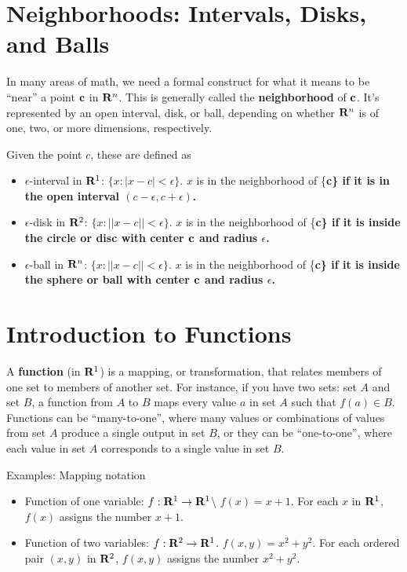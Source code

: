 \documentclass[]{book}
\providecommand{\tightlist}{%
  \setlength{\itemsep}{0pt}\setlength{\parskip}{0pt}}
\theoremstyle{definition}
\theoremstyle{definition}
\theoremstyle{definition}
\theoremstyle{remark}
\begin{document}
\section{Neighborhoods: Intervals, Disks, and
Balls}\label{neighborhoods-intervals-disks-and-balls}

In many areas of math, we need a formal construct for what it means to
be ``near'' a point \(\bf c\) in \({\bf R}^n\). This is generally called
the \textbf{neighborhood} of \(\bf c\). It's represented by an open
interval, disk, or ball, depending on whether \({\bf R}^n\) is of one,
two, or more dimensions, respectively.

Given the point \(c\), these are defined as

\begin{itemize}
\tightlist
\item
  \(\epsilon\)-interval in \({\bf R}^1\): \(\{x : |x-c|<\epsilon \}\).
  \(x\) is in the neighborhood of \{\bf c\} if it is in the open
  interval \((c-\epsilon,c+\epsilon)\).
\item
  \(\epsilon\)-disk in \({\bf R}^2\): \(\{x : || x-c ||<\epsilon\}\).
  \(x\) is in the neighborhood of \{\bf c\} if it is inside the circle
  or disc with center \(\bf c\) and radius \(\epsilon\).
\item
  \(\epsilon\)-ball in \({\bf R}^n\): \(\{x : || x-c ||<\epsilon\}\).
  \(x\) is in the neighborhood of \{\bf c\} if it is inside the sphere
  or ball with center \(\bf c\) and radius \(\epsilon\).
\end{itemize}

\section{Introduction to Functions}\label{introduction-to-functions}

A \textbf{function} (in \({\bf R}^1\)) is a mapping, or transformation,
that relates members of one set to members of another set. For instance,
if you have two sets: set \(A\) and set \(B\), a function from \(A\) to
\(B\) maps every value \(a\) in set \(A\) such that \(f(a) \in B\).
Functions can be ``many-to-one'', where many values or combinations of
values from set \(A\) produce a single output in set \(B\), or they can
be ``one-to-one'', where each value in set \(A\) corresponds to a single
value in set \(B\).

Examples: Mapping notation

\begin{itemize}
\tightlist
\item
  Function of one variable: \(f:{\bf R}^1\to{\bf R}^1\)\textbackslash{}
  \(f(x)=x+1\). For each \(x\) in \({\bf R}^1\), \(f(x)\) assigns the
  number \(x+1\).
\item
  Function of two variables: \(f: {\bf R}^2\to{\bf R}^1\).
  \(f(x,y)=x^2+y^2\). For each ordered pair \((x,y)\) in \({\bf R}^2\),
  \(f(x,y)\) assigns the number \(x^2+y^2\).
\end{itemize}
\end{document}
